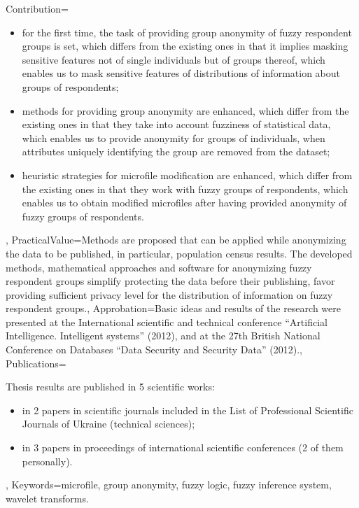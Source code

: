 \documentclass{master_thesis}
\begin{document}
{	Contribution={\begin{itemize}
		\item for the first time, the task of providing group anonymity of fuzzy respondent groups is set, which differs from the existing ones in that it implies masking sensitive features not of single individuals but of groups thereof, which enables us to mask sensitive features of distributions of information about groups of respondents;
		\item methods for providing group anonymity are enhanced, which differ from the existing ones in that they take into account fuzziness of statistical data, which enables us to provide anonymity for groups of individuals, when attributes uniquely identifying the group are removed from the dataset;
		\item heuristic strategies for microfile modification are enhanced, which differ from the existing ones in that they work with fuzzy groups of respondents, which enables us to obtain modified microfiles after having provided anonymity of fuzzy groups of respondents.
	\end{itemize}
	},
	PracticalValue={Methods are proposed that can be applied while anonymizing the data to be published, in particular, population census results. The developed methods, mathematical approaches and software for anonymizing fuzzy respondent groups simplify protecting the data before their publishing, favor providing sufficient privacy level for the distribution of information on fuzzy respondent groups.},
	Approbation={Basic ideas and results of the research were presented at the International scientific and technical conference “Artificial Intelligence. Intelligent systems” (2012), and at the 27th British National Conference on Databases “Data Security and Security Data” (2012).},
	Publications={Thesis results are published in 5 scientific works:
\begin{itemize}
	\item in 2 papers in scientific journals included in the List of Professional Scientific Journals of Ukraine (technical sciences);
	\item in 3 papers in proceedings of international scientific conferences (2 of them personally).
\end{itemize}
	},
	Keywords={microfile, group anonymity, fuzzy logic, fuzzy inference system, wavelet transforms.}
}

\tableofcontents

\shortings

\intro
\end{document}
